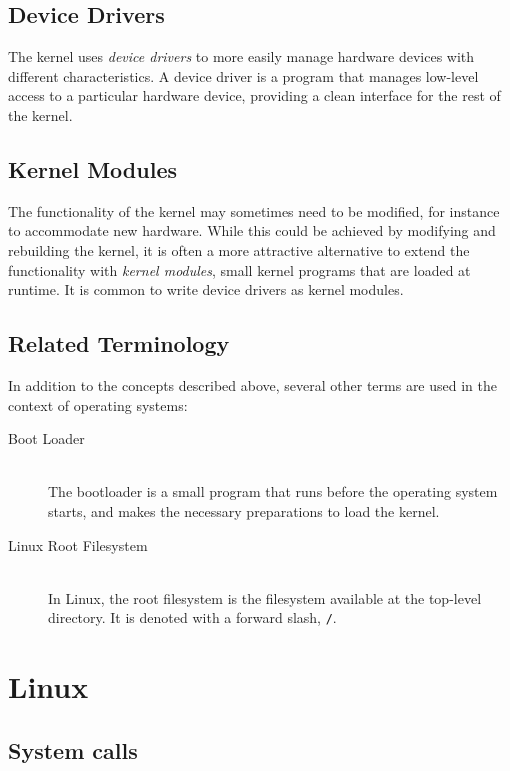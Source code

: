 \subsection{Device Drivers}
The kernel uses \emph{device drivers} to more easily manage hardware devices with different characteristics. A device driver is a program that manages low-level access to a particular hardware device, providing a clean interface for the rest of the kernel.

\subsection{Kernel Modules}\label{sec:kernel-modules}
The functionality of the kernel may sometimes need to be modified, for instance to accommodate new hardware. While this could be achieved by modifying and rebuilding the kernel, it is often a more attractive alternative to extend the functionality with \emph{kernel modules}, small kernel programs that are loaded at runtime. It is common to write device drivers as kernel modules.

\subsection{Related Terminology}
In addition to the concepts described above, several other terms are used in the context of operating systems:
\begin{description}
\item[Boot Loader] \hfill \\
The bootloader is a small program that runs before the operating system starts, and makes the necessary preparations to load the kernel.
\item[Linux Root Filesystem] \hfill \\
 In Linux, the root filesystem is the filesystem available at the top-level directory. It is denoted with a forward slash, \texttt{/}.
\end{description}



\section{Linux}

\subsection{System calls}

